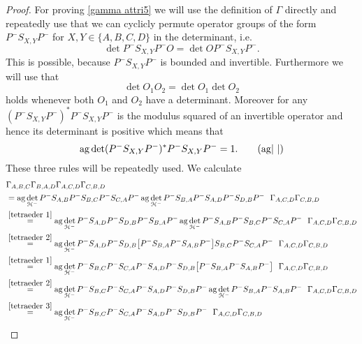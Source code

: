 \documentclass[b5paper,draft,openbib,12pt]{memoir}
\DeclareMathOperator{\ag}{ag}
\begin{document}
\begin{proof}
For proving \eqref{gamma attri5} we will use the definition of \(\Gamma\) directly and repeatedly use that we can cyclicly permute operator groups of the form
\(P^- S_{X,Y}P^-\) for \(X,Y\in \{A,B,C,D\}\) in the determinant, i.e.
\begin{equation}\label{tetraeder 1}
\det P^- S_{X,Y}P^- O = \det O P^- S_{X,Y}P^-.\tag{\(\circlearrowleft\)}
\end{equation}
This is possible, because \(P^- S_{X,Y}P^-\) is bounded and invertible. Furthermore we will use that 
\begin{equation}\label{tetraeder 2}
\det O_1 O_2 = \det O_1 \det O_2\tag{\(\leftrightarrow\)}
\end{equation}
holds whenever 
both \(O_1\) and \(O_2\) have a determinant. Moreover for any  \((P^- S_{X,Y}P^-)^*P^- S_{X,Y}P^-\) is the modulus squared of an invertible operator and hence
its determinant is positive which means that 
\begin{equation}\label{tetraeder 3}
\ag \det (P^- S_{X,Y}P^-)^*P^- S_{X,Y}P^-=1.\tag{\(\ag\!|\,\, |\)}
\end{equation}
These three rules will be repeatedly used. We calculate
\begin{align}
&\Gamma_{A,B,C}\Gamma_{B,A,D}\Gamma_{A,C,D}\Gamma_{C,B,D}\\
&=\ag \det_{\mathcal{H}^-}P^- S_{A,B}P^- S_{B,C}P^- S_{C,A}P^- \ag \det_{\mathcal{H}^-}P^- S_{B,A}P^- S_{A,D}P^- S_{D,B}P^-~~ \Gamma_{A,C,D}\Gamma_{C,B,D}\\
&\overset{\eqref{tetraeder 1}}{=}
\ag \det_{\mathcal{H}^-}P^-S_{A,D}P^- S_{D,B}P^- S_{B,A}P^- \ag \det_{\mathcal{H}^-}P^- S_{A,B}P^- S_{B,C}P^- S_{C,A}P^- ~~  \Gamma_{A,C,D}\Gamma_{C,B,D}\\
&\overset{\eqref{tetraeder 2}}{=}
\ag \det_{\mathcal{H}^-}P^-S_{A,D}P^- S_{D,B} \big[P^- S_{B,A} P^- S_{A,B}P^-\big] S_{B,C}P^- S_{C,A}P^- ~~ \Gamma_{A,C,D}\Gamma_{C,B,D}\\
&\overset{\eqref{tetraeder 1}}{=}
\ag \det_{\mathcal{H}^-}P^-S_{B,C}P^- S_{C,A}P^-S_{A,D}P^- S_{D,B} \big[P^- S_{B,A} P^- S_{A,B}P^-\big]  ~~ \Gamma_{A,C,D}\Gamma_{C,B,D}\\
&\overset{\eqref{tetraeder 2}}{=}
\ag \det_{\mathcal{H}^-}P^-S_{B,C}P^- S_{C,A}P^-S_{A,D}P^- S_{D,B}P^-  \ag \det_{\mathcal{H}^-} P^- S_{B,A} P^- S_{A,B}P^-  ~~ \Gamma_{A,C,D}\Gamma_{C,B,D}\\
&\overset{\eqref{tetraeder 3}}{=}
\ag \det_{\mathcal{H}^-}P^-S_{B,C}P^- S_{C,A}P^-S_{A,D}P^- S_{D,B}P^-   ~~ \Gamma_{A,C,D}\Gamma_{C,B,D}\\

\end{align}
\end{proof}
\end{document}
